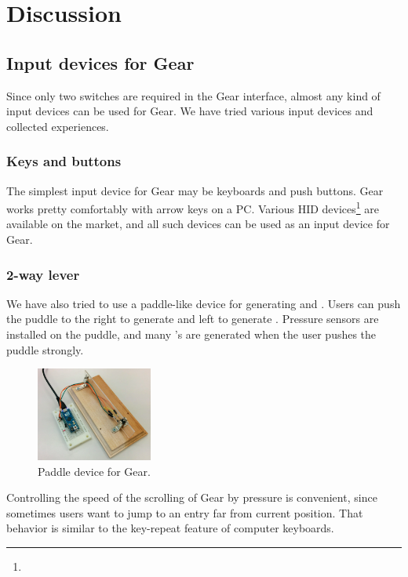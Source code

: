 \documentclass[conference]{IEEEtran}
\def\up{\tsf{▲}}
\def\down{\tsf{▼}}
\begin{document}
\section{Discussion}

\subsection{Input devices for Gear}

Since only two switches are required in the Gear interface,
almost any kind of input devices can be used for Gear.
We have tried various input devices and collected experiences.

\subsubsection{Keys and buttons}

The simplest input device for Gear may be keyboards and push buttons.
Gear works pretty comfortably with arrow keys on a PC.
Various HID devices\footnote{
} are available on the market, and
all such devices can be used as an input device for Gear.

\subsubsection{2-way lever}

We have also tried to use a paddle-like device for generating {\up} and {\down}.
Users can push the puddle to the right to generate {\up} and
left to generate {\down}.
Pressure sensors are installed on the puddle, and
many {\up}'s are generated when the user pushes the puddle strongly.

\begin{figure}[H]
  \centerline{\includegraphics[width=38mm,bb=0 0 514 418]{figures/3c2de63899653056f3c6be835b9aaf43.png}}
  \caption{Paddle device for Gear.}
  \label{paddle}
\end{figure}

Controlling the speed of the scrolling of Gear by pressure is convenient,
since sometimes users want to jump to an entry far from current position.
That behavior is similar to the key-repeat feature of computer keyboards.
\end{document}
